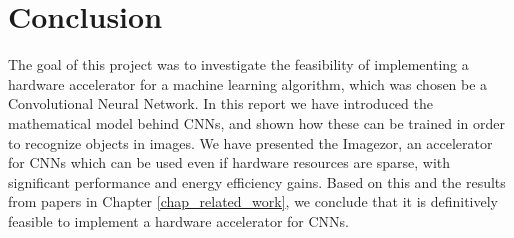 \chapter{Conclusion}

The goal of this project was to investigate the feasibility of implementing a hardware accelerator for a machine learning algorithm, which was chosen be a Convolutional Neural Network. In this report we have introduced the mathematical model behind CNNs, and shown how these can be trained in order to recognize objects in images. We have presented the Imagezor, an accelerator for CNNs which can be used even if hardware resources are sparse, with significant performance and energy efficiency gains. Based on this and the results from papers in Chapter \ref{chap_related_work}, we conclude that it is definitively feasible to implement a hardware accelerator for CNNs.  


